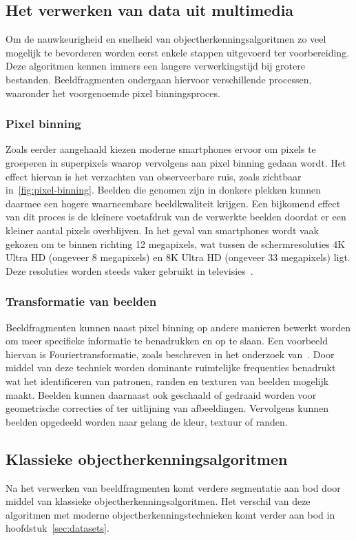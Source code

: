 \subsection{Het verwerken van data uit multimedia}\label{subsec:het-verwerken-van-data}
Om de nauwkeurigheid en snelheid van objectherkenningsalgoritmen zo veel mogelijk te bevorderen worden eerst enkele stappen uitgevoerd ter voorbereiding.
Deze algoritmen kennen immers een langere verwerkingstijd bij grotere bestanden.
Beeldfragmenten ondergaan hiervoor verschillende processen, waaronder het voorgenoemde pixel binningsproces.

\subsubsection{Pixel binning}
Zoals eerder aangehaald kiezen moderne smartphones ervoor om pixels te groeperen in superpixels waarop vervolgens aan pixel binning gedaan wordt.
Het effect hiervan is het verzachten van observeerbare ruis, zoals zichtbaar in~\ref{fig:pixel-binning}.
Beelden die genomen zijn in donkere plekken kunnen daarmee een hogere waarneembare beeldkwaliteit krijgen.
Een bijkomend effect van dit proces is de kleinere voetafdruk van de verwerkte beelden doordat er een kleiner aantal pixels overblijven.
In het geval van smartphones wordt vaak gekozen om te binnen richting 12 megapixels, wat tussen de schermresoluties 4K Ultra HD (ongeveer 8 megapixels) en 8K Ultra HD (ongeveer 33 megapixels) ligt.
Deze resoluties worden steeds vaker gebruikt in televisies~\autocite{Statista2024}.

\subsubsection{Transformatie van beelden}
Beeldfragmenten kunnen naast pixel binning op andere manieren bewerkt worden om meer specifieke informatie te benadrukken en op te slaan.
Een voorbeeld hiervan is Fouriertransformatie, zoals beschreven in het onderzoek van~\textcite{Olaoye2024}.
Door middel van deze techniek worden dominante ruimtelijke frequenties benadrukt wat het identificeren van patronen, randen en texturen van beelden mogelijk maakt.
Beelden kunnen daarnaast ook geschaald of gedraaid worden voor geometrische correcties of ter uitlijning van afbeeldingen.
Vervolgens kunnen beelden opgedeeld worden naar gelang de kleur, textuur of randen.

\subsection{Klassieke objectherkenningsalgoritmen}
\label{subsec:klassieke-objectherkenningsalgoritmen}
Na het verwerken van beeldfragmenten komt verdere segmentatie aan bod door middel van klassieke objectherkenningsalgoritmen.
Het verschil van deze algoritmen met moderne objectherkenningstechnieken komt verder aan bod in hoofdstuk~\ref{sec:datasets}.


